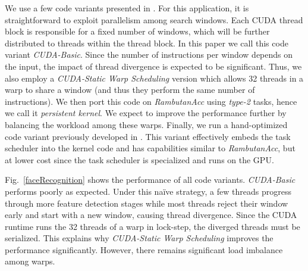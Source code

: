We use a few code variants presented in \cite{facedetection_dws}.
For this application, it is straightforward to exploit parallelism among search windows.
Each CUDA thread block is responsible for a fixed number of windows, which will be further distributed to threads within the thread block.
In this paper we call this code variant {\em CUDA-Basic}.
Since the number of instructions per window depends on the input, the impact of thread divergence is expected to be significant.
Thus, we also employ a {\em CUDA-Static Warp Scheduling} version which allows 32 threads in a warp to share a window (and thus they perform the same number of instructions).
We then port this code on {\em RambutanAcc} using {\em type-2} tasks, hence we call it {\em persistent kernel}.
We expect to improve the performance further by balancing the workload among these warps.
Finally, we run a hand-optimized code variant previously developed in \cite{facedetection_dws}.
This variant effectively embeds the task scheduler into the kernel code and has capabilities similar to {\em RambutanAcc},
but at lower cost since the task scheduler is specialized and runs on the GPU.

Fig.~\ref{faceRecognition} shows the performance of all code variants.
{\em CUDA-Basic} performs poorly as expected.
Under this na{\"i}ve strategy, a few threads progress through more feature detection stages while most threads reject their window early and start with a new window, causing thread divergence.
Since the CUDA runtime runs the 32 threads of a warp in lock-step, the diverged threads must be serialized.
This explains why {\em CUDA-Static Warp Scheduling} improves the performance significantly.
However, there remains significant load imbalance among warps.

